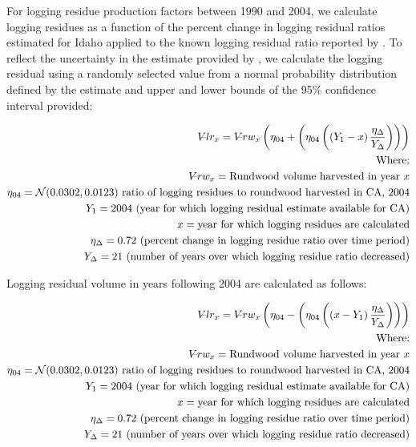 \documentclass[a4paper]{article}
\begin{document}
For logging residue production factors between 1990 and 2004, we calculate logging residues as a function of the percent change in logging residual ratios estimated for Idaho \citet{Simmons2014} applied to the known logging residual ratio reported by \citet{Morgan}. To reflect the uncertainty in the estimate provided by \citet{Morgan}, we calculate the logging residual using a randomly selected value from a normal probability distribution defined by the estimate and upper and lower bounds of the 95\% confidence interval provided:


\begin{align*}
V\llap{--}lr_{x} = V\llap{--}rw_{x}\left(\eta_{04}+ \left(\eta_{04}\left(\left(Y_1-x\right)\frac{\eta_\Delta}{Y_\Delta}\right)\right)\right)\\
\text{Where:}\\
V\llap{--}rw_{x} = \text{Rundwood volume harvested in year }x\\
\eta_{04} = \mathcal{N}(0.0302,0.0123) \text{ ratio of logging residues to roundwood harvested in CA, 2004}\\
Y_1 = 2004 \text{ (year for which logging residual estimate available for CA)} \\
x = \text{year for which logging residues are calculated}\\
\eta_\Delta = 0.72 \text{ (percent change in logging residue ratio over time period)}\\
Y_\Delta = 21\text{ (number of years over which logging residue ratio decreased)}
\end{align*}

Logging residual volume in years following 2004 are calculated as follows:

\begin{align*}
V\llap{--}lr_{x} = V\llap{--}rw_{x}\left(\eta_{04}- \left(\eta_{04}\left(\left(x-Y_1\right)\frac{\eta_\Delta}{Y_\Delta}\right)\right)\right)\\
\text{Where:}\\
V\llap{--}rw_{x} = \text{Rundwood volume harvested in year }x\\
\eta_{04} = \mathcal{N}(0.0302,0.0123) \text{ ratio of logging residues to roundwood harvested in CA, 2004}\\
Y_1 = 2004 \text{ (year for which logging residual estimate available for CA)} \\
x = \text{year for which logging residues are calculated}\\
\eta_\Delta = 0.72 \text{ (percent change in logging residue ratio over time period)}\\
Y_\Delta = 21\text{ (number of years over which logging residue ratio decreased)}
\end{align*}
\end{document}
